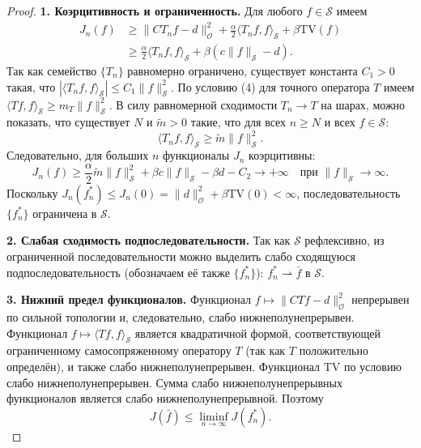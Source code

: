 \documentclass[a4paper,14pt,oneside,openany]{extarticle}
\begin{document}
\begin{proof}
\textbf{1. Коэрцитивность и ограниченность.}
Для любого $f \in \mathcal{S}$ имеем
\begin{align*}
    J_n(f) &\ge \|C T_n f - d\|_{\mathcal{O}}^2 + \frac{\alpha}{2} \langle T_n f, f\rangle_{\mathcal{S}} + \beta \mathrm{TV}(f) \\
    &\ge \frac{\alpha}{2} \langle T_n f, f\rangle_{\mathcal{S}} + \beta (c \|f\|_{\mathcal{S}} - d).
\end{align*}
Так как семейство $\{T_n\}$ равномерно ограничено, существует константа $C_1>0$ такая, что $|\langle T_n f, f\rangle_{\mathcal{S}}| \le C_1 \|f\|_{\mathcal{S}}^2$.
По условию (4) для точного оператора $T$ имеем $\langle T f, f\rangle_{\mathcal{S}} \ge m_T \|f\|_{\mathcal{S}}^2$.
В силу равномерной сходимости $T_n \to T$ на шарах, можно показать, что существует $N$ и $\tilde{m}>0$ такие, что для всех $n \ge N$ и всех $f \in \mathcal{S}$:
\begin{equation}
    \langle T_n f, f\rangle_{\mathcal{S}} \ge \tilde{m} \|f\|_{\mathcal{S}}^2.
\end{equation}
Следовательно, для больших $n$ функционалы $J_n$ коэрцитивны:
\begin{equation}
    J_n(f) \ge \frac{\alpha}{2} \tilde{m} \|f\|_{\mathcal{S}}^2 + \beta c \|f\|_{\mathcal{S}} - \beta d - C_2 \to +\infty \quad \text{при } \|f\|_{\mathcal{S}} \to \infty.
\end{equation}
Поскольку $J_n(f_n^*) \le J_n(0) = \|d\|_{\mathcal{O}}^2 + \beta \mathrm{TV}(0) < \infty$, последовательность $\{f_n^*\}$ ограничена в $\mathcal{S}$.

\textbf{2. Слабая сходимость подпоследовательности.}
Так как $\mathcal{S}$ рефлексивно, из ограниченной последовательности можно выделить слабо сходящуюся подпоследовательность (обозначаем её также $\{f_n^*\}$): $f_n^* \rightharpoonup \bar f$ в $\mathcal{S}$.

\textbf{3. Нижний предел функционалов.}
Функционал $f \mapsto \|C T f - d\|_{\mathcal{O}}^2$ непрерывен по сильной топологии и, следовательно, слабо нижнеполунепрерывен.
Функционал $f \mapsto \langle T f, f\rangle_{\mathcal{S}}$ является квадратичной формой, соответствующей ограниченному самосопряженному оператору $T$ (так как $T$ положительно определён), и также слабо нижнеполунепрерывен.
Функционал $\mathrm{TV}$ по условию слабо нижнеполунепрерывен.
Сумма слабо нижнеполунепрерывных функционалов является слабо нижнеполунепрерывной. Поэтому
\begin{equation}
    J(\bar f) \le \liminf_{n\to\infty} J(f_n^*).
\end{equation}


\end{proof}
\end{document}
